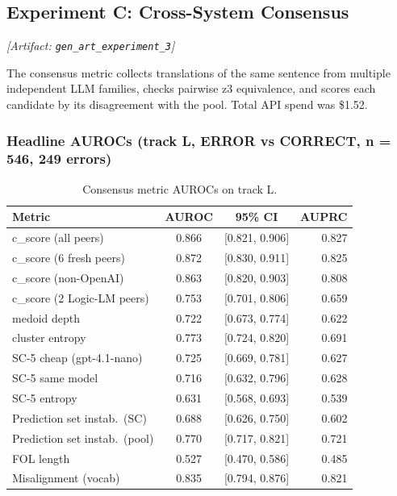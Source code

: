 \documentclass[11pt,letterpaper]{article}
\begin{document}
\subsection{Experiment C: Cross-System Consensus}
\label{sec:exp_c}
\noindent\textit{[Artifact: \texttt{gen\_art\_experiment\_3}]}

The consensus metric collects translations of the same sentence from multiple independent LLM families, checks pairwise z3 equivalence, and scores each candidate by its disagreement with the pool. Total API spend was \$1.52.

\subsubsection{Headline AUROCs (track L, ERROR vs CORRECT, n = 546, 249 errors)}

\begin{table}[!htbp]
\centering
\caption{Consensus metric AUROCs on track L.}
\label{tab:consensus_headline}
\begin{tabular}{lccr}
\toprule
Metric & AUROC & 95\% CI & AUPRC \\
\midrule
c\_score (all peers) & 0.866 & [0.821, 0.906] & 0.827 \\
c\_score (6 fresh peers) & 0.872 & [0.830, 0.911] & 0.825 \\
c\_score (non-OpenAI) & 0.863 & [0.820, 0.903] & 0.808 \\
c\_score (2 Logic-LM peers) & 0.753 & [0.701, 0.806] & 0.659 \\
medoid depth & 0.722 & [0.673, 0.774] & 0.622 \\
cluster entropy & 0.773 & [0.724, 0.820] & 0.691 \\
SC-5 cheap (gpt-4.1-nano) & 0.725 & [0.669, 0.781] & 0.627 \\
SC-5 same model & 0.716 & [0.632, 0.796] & 0.628 \\
SC-5 entropy & 0.631 & [0.568, 0.693] & 0.539 \\
Prediction set instab.\ (SC) & 0.688 & [0.626, 0.750] & 0.602 \\
Prediction set instab.\ (pool) & 0.770 & [0.717, 0.821] & 0.721 \\
FOL length & 0.527 & [0.470, 0.586] & 0.485 \\
Misalignment (vocab) & 0.835 & [0.794, 0.876] & 0.821 \\
\bottomrule
\end{tabular}
\end{table}
\end{document}
